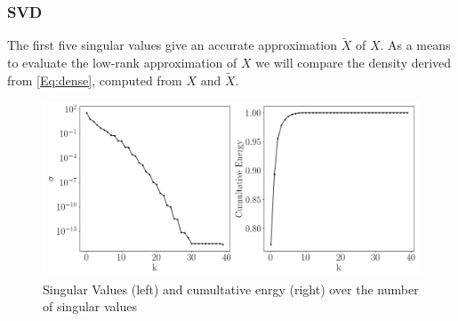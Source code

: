 \documentclass[12pt, a4paper]{article}
\begin{document}
\subsubsection{SVD}\label{Sec:SVD}
The first five singular values give an accurate approximation $\tilde{X}$ of $X$.  
As a means to evaluate the low-rank approximation of $X$ we will compare the density derived from \cref{Eq:dense}, computed from $X$ and $\tilde{X}$.
\begin{figure}[!htbp]
	\centering
	\includegraphics[width=\textwidth]{Figures/Cumultative_Singular_Values_kn001.png}
	\caption{Singular Values (left) and cumultative enrgy (right) over the number of singular values}
	\label{Fig:cumu_sing}
\end{figure}
\end{document}
